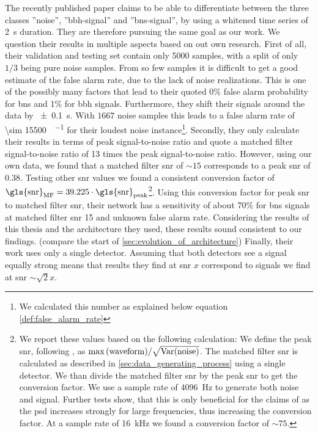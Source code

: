 The recently published paper \cite{bns_network} claims to be able to differentiate between the three classes ''noise'', ''\gls{bbh}-signal'' and ''\gls{bns}-signal'', by using a whitened time series of \SI{2}{\s} duration. They are therefore pursuing the same goal as our work. We question their results in multiple aspects based on out own research. First of all, their validation and testing set contain only 5000 samples, with a split of only $1/3$ being pure noise samples. From so few samples it is difficult to get a good estimate of the false alarm rate, due to the lack of noise realizations. This is one of the possibly many factors that lead to their quoted 0\% false alarm probability for \gls{bns} and 1\% for \gls{bbh} signals. Furthermore, they shift their signals around the data by \SI{\pm 0.1}{\s}. With $1667$ noise samples this leads to a false alarm rate of \SI[per-mode=fraction]{\sim 15500}{\samples\per\month} for their loudest noise instance\footnote{We calculated this number as explained below equation \eqref{def:false_alarm_rate}}. Secondly, they only calculate their results in terms of peak signal-to-noise ratio and quote a matched filter signal-to-noise ratio of 13 times the peak signal-to-noise ratio. However, using our own data, we found that a matched filter \gls{snr} of $\sim 15$ corresponds to a peak \gls{snr} of $0.38$. Testing other \gls{snr} values we found a consistent conversion factor of $\text{\gls{snr}}_\text{MF} = 39.225\cdot\text{\gls{snr}}_\text{peak}$\footnote{We report these values based on the following calculation: We define the peak \gls{snr}, following \cite{bns_network}, as $\max{\left( \text{waveform} \right)} / \sqrt{\text{Var}{\left( \text{noise} \right)}}$. The matched filter \gls{snr} is calculated as described in \autoref{sec:data_generating_process} using a single detector. We than divide the matched filter \gls{snr} by the peak \gls{snr} to get the conversion factor. We use a sample rate of \SI{4096}{\hertz} to generate both noise and signal. Further tests show, that this is only beneficial for the claims of \cite{bns_network} as the \gls{psd} increases strongly for large frequencies, thus increasing the conversion factor. At a sample rate of \SI{16}{\kilo\hertz} we found a conversion factor of $\sim 75$.}. Using this conversion factor for peak \gls{snr} to matched filter \gls{snr}, their network has a sensitivity of about 70\% for \gls{bns} signals at matched filter \gls{snr} 15 and unknown false alarm rate. Considering the results of this thesis and the architecture they used, these results sound consistent to our findings. (compare the start of \autoref{sec:evolution_of_architecture}) Finally, their work uses only a single detector. Assuming that both detectors see a signal equally strong means that results they find at \gls{snr} $x$ correspond to signals we find at \gls{snr} $\sim \sqrt{2}x$.\smallskip\\
